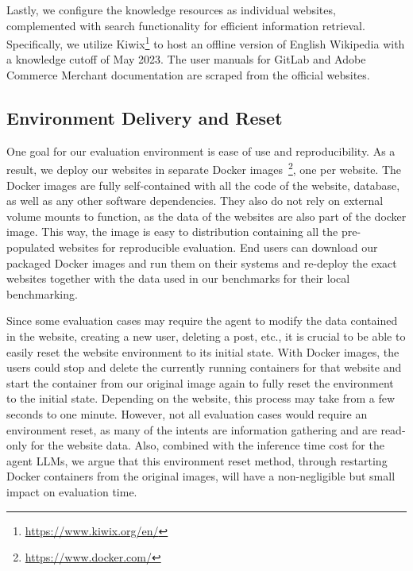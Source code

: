 Lastly, we configure the knowledge resources as individual websites, complemented with search functionality for efficient information retrieval.
Specifically, we utilize Kiwix\footnote{\url{https://www.kiwix.org/en/}} to host an offline version of English Wikipedia with a knowledge cutoff of May 2023. 
The user manuals for GitLab and Adobe Commerce Merchant documentation are scraped from the official websites.%

\subsection{Environment Delivery and Reset}\label{app:env_reset}
One goal for our evaluation environment is ease of use and reproducibility.
As a result, we deploy our websites in separate Docker images~\footnote{\url{https://www.docker.com/}}, one per website.
The Docker images are fully self-contained with all the code of the website, database, as well as any other software dependencies.
They also do not rely on external volume mounts to function, as the data of the websites are also part of the docker image.
This way, the image is easy to distribution containing all the pre-populated websites for reproducible evaluation.
End users can download our packaged Docker images and run them on their systems and re-deploy the exact websites together with the data used in our benchmarks for their local benchmarking.

Since some evaluation cases may require the agent to modify the data contained in the website, \eg creating a new user, deleting a post, etc., it is crucial to be able to easily reset the website environment to its initial state.
With Docker images, the users could stop and delete the currently running containers for that website and start the container from our original image again to fully reset the environment to the initial state.
Depending on the website, this process may take from a few seconds to one minute.
However, not all evaluation cases would require an environment reset, as many of the intents are information gathering and are read-only for the website data.
Also, combined with the inference time cost for the agent LLMs, we argue that this environment reset method, through restarting Docker containers from the original images, will have a non-negligible but small impact on evaluation time.

